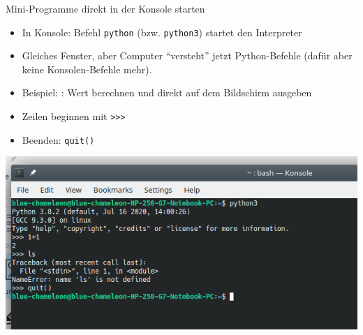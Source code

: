 \begin{frame}{Mini-Programme direkt in der Konsole starten}
%
\begin{minipage}[t]{.39\linewidth}
\begin{itemize}
\item In Konsole: Befehl \texttt{python} (bzw. \texttt{python3}) startet den Interpreter
\item Gleiches Fenster, aber Computer \enquote{versteht} jetzt Python-Befehle (dafür aber keine Konsolen-Befehle mehr).
\item Beispiel: : Wert berechnen und direkt auf dem Bildschirm ausgeben
\item Zeilen beginnen mit \texttt{>{}>{}>}
\item Beenden: \texttt{quit()}
\end{itemize}
\end{minipage}
%
%
\begin{minipage}[t]{.59\linewidth}
\vspace{0pt}
\includegraphics[width=\linewidth]{./gfx/interpreterConsole}
\end{minipage}
%
\end{frame}


